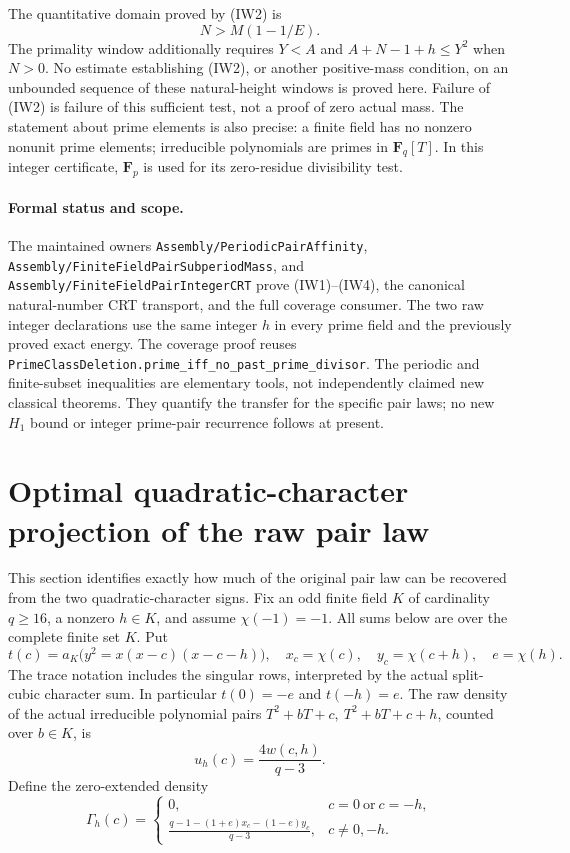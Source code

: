 \documentclass[11pt]{article}
\begin{document}
The quantitative domain proved by (IW2) is
\[
                      N>M(1-1/E).
\]
The primality window additionally requires \(Y<A\) and
\(A+N-1+h\le Y^2\) when \(N>0\). No estimate establishing (IW2),
or another positive-mass condition, on an unbounded sequence of
these natural-height windows is proved here. Failure of (IW2)
is failure of this sufficient test, not a proof of zero actual mass.
The statement about prime elements is also precise: a finite field
has no nonzero nonunit prime elements; irreducible polynomials are
primes in \(\mathbf F_q[T]\). In this integer certificate,
\(\mathbf F_p\) is used for its zero-residue divisibility test.

\paragraph{Formal status and scope.}
The maintained owners \texttt{Assembly/PeriodicPairAffinity},
\texttt{Assembly/FiniteFieldPairSubperiodMass}, and
\texttt{Assembly/FiniteFieldPairIntegerCRT} prove (IW1)--(IW4),
the canonical natural-number CRT transport, and the full coverage
consumer. The two raw integer declarations use the same integer \(h\)
in every prime field and the previously proved exact energy.
The coverage proof reuses
\texttt{PrimeClassDeletion.prime\_iff\_no\_past\_prime\_divisor}.
The periodic and finite-subset inequalities are elementary tools,
not independently claimed new classical theorems. They quantify
the transfer for the specific pair laws; no new \(H_1\) bound or
integer prime-pair recurrence follows at present.

\section{Optimal quadratic-character projection of the raw pair law}
\label{sec:optimal-character-pair-law}
This section identifies exactly how much of the original pair law can be
recovered from the two quadratic-character signs. Fix an odd finite field
\(K\) of cardinality \(q\ge16\), a nonzero \(h\in K\), and assume
\(\chi(-1)=-1\). All sums below are over the complete finite set \(K\).
Put
\[
 t(c)=a_K\bigl(y^2=x(x-c)(x-c-h)\bigr),\quad
 x_c=\chi(c),\quad y_c=\chi(c+h),\quad e=\chi(h).
\]
The trace notation includes the singular rows, interpreted by the actual
split-cubic character sum. In particular \(t(0)=-e\) and \(t(-h)=e\).
The raw density of the actual irreducible polynomial pairs
\(T^2+bT+c,\ T^2+bT+c+h\), counted over \(b\in K\), is
\[
 u_h(c)=\frac{4w(c,h)}{q-3}.
\]
Define the zero-extended density
\[
 \Gamma_h(c)=
 \begin{cases}
 0,&c=0\ \text{or}\ c=-h,\\[2mm]
 \displaystyle
 \frac{q-1-(1+e)x_c-(1-e)y_c}{q-3},&c\ne0,-h.
 \end{cases}
 \tag{CP1}
\]
\end{document}
